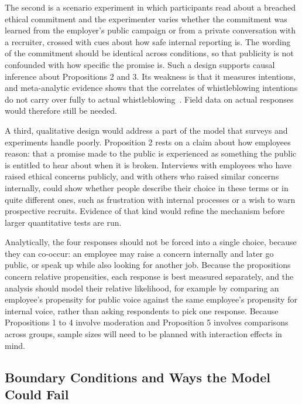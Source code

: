 The second is a scenario experiment in which participants read about a breached ethical commitment and the experimenter varies whether the commitment was learned from the employer's public campaign or from a private conversation with a recruiter, crossed with cues about how safe internal reporting is. The wording of the commitment should be identical across conditions, so that publicity is not confounded with how specific the promise is. Such a design supports causal inference about Propositions 2 and 3. Its weakness is that it measures intentions, and meta-analytic evidence shows that the correlates of whistleblowing intentions do not carry over fully to actual whistleblowing~\citep{mesmermagnus2005whistleblowing}. Field data on actual responses would therefore still be needed.

A third, qualitative design would address a part of the model that surveys and experiments handle poorly. Proposition 2 rests on a claim about how employees reason: that a promise made to the public is experienced as something the public is entitled to hear about when it is broken. Interviews with employees who have raised ethical concerns publicly, and with others who raised similar concerns internally, could show whether people describe their choice in these terms or in quite different ones, such as frustration with internal processes or a wish to warn prospective recruits. Evidence of that kind would refine the mechanism before larger quantitative tests are run.

Analytically, the four responses should not be forced into a single choice, because they can co-occur: an employee may raise a concern internally and later go public, or speak up while also looking for another job. Because the propositions concern relative propensities, each response is best measured separately, and the analysis should model their relative likelihood, for example by comparing an employee's propensity for public voice against the same employee's propensity for internal voice, rather than asking respondents to pick one response. Because Propositions 1 to 4 involve moderation and Proposition 5 involves comparisons across groups, sample sizes will need to be planned with interaction effects in mind.

\subsection{Boundary Conditions and Ways the Model Could Fail}

